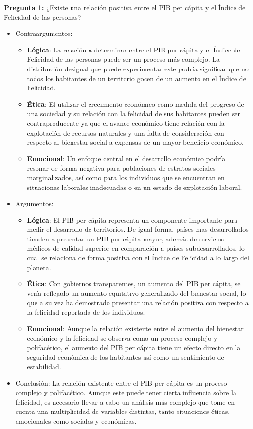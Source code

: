 \textbf{Pregunta 1:} ¿Existe una relación positiva entre el PIB per cápita y el Índice de Felicidad de las personas?
\begin{itemize}
    \item Contraargumentos:
    \begin{itemize}
        \item \textbf{Lógica}: La relación a determinar entre el PIB per cápita y el Índice de Felicidad de las personas puede ser un proceso más complejo. La distribución desigual que puede experimentar este podría significar que no todos los habitantes de un territorio gocen de un aumento en el Índice de Felicidad.
        \item \textbf{Ética}: El utilizar el crecimiento económico como medida del progreso de una sociedad y su relación con la felicidad de sus habitantes pueden ser contraproducente ya que el avance económico tiene relación con la explotación de recursos naturales y una falta de consideración con respecto al bienestar social a expensas de un mayor beneficio económico.
        \item \textbf{Emocional}: Un enfoque central en el desarrollo económico podría resonar de forma negativa para poblaciones de estratos sociales marginalizados, así como para los individuos que se encuentran en situaciones laborales inadecuadas o en un estado de explotación laboral.
    \end{itemize}
    \item Argumentos:
    \begin{itemize}
        \item \textbf{Lógica}: El PIB per cápita representa un componente importante para medir el desarrollo de territorios. De igual forma, países mas desarrollados tienden a presentar un PIB per cápita mayor, además de servicios médicos de calidad superior en comparación a países subdesarrollados, lo cual se relaciona de forma positiva con el Índice de Felicidad a lo largo del planeta.
        \item \textbf{Ética}: Con gobiernos transparentes, un aumento del PIB per cápita, se vería reflejado un aumento equitativo generalizado del bienestar social, lo que a su vez ha demostrado presentar una relación positiva con respecto a la felicidad reportada de los individuos.
        \item \textbf{Emocional}: Aunque la relación existente entre el aumento del bienestar económico y la felicidad se observa como un proceso complejo y polifacético, el aumento del PIB per cápita tiene un efecto directo en la seguridad económica de los habitantes así como un sentimiento de estabilidad.
    \end{itemize}
    \item Conclusión: La relación existente entre el PIB per cápita es un proceso complejo y polifacético. Aunque este puede tener cierta influencia sobre la felicidad, es necesario llevar a cabo un análisis más complejo que tome en cuenta una multiplicidad de variables distintas, tanto situaciones éticas, emocionales como sociales y económicas.
\end{itemize}

